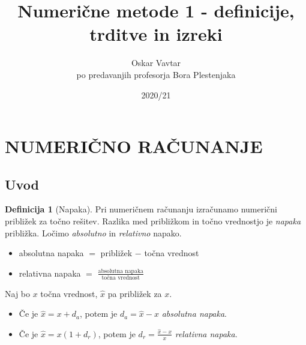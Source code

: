 \documentclass[11pt]{article}
\title{Numerične metode 1 - definicije, trditve in izreki}
\author{Oskar Vavtar \\
po predavanjih profesorja Bora Plestenjaka}
\date{2020/21}
\theoremstyle{definition}
\newtheorem{definicija}{Definicija}[section]
\begin{document}
\maketitle
\pagebreak
\tableofcontents
\pagebreak


\section{NUMERIČNO RAČUNANJE}
\vspace{0.5cm}


\subsection{Uvod}
\vspace{0.5cm}

\begin{definicija}[Napaka]

Pri numeričnem računanju izračunamo numerični približek za točno rešitev. Razlika med približkom in točno vrednostjo je \textit{napaka} približka. Ločimo \textit{absolutno} in \textit{relativno} napako.

\begin{itemize}
	\item absolutna napaka $=$ približek $-$ točna vrednost
	\item relativna napaka $=$ $\frac{\text{absolutna napaka}}{\text{točna vrednost}}$
\end{itemize}

Naj bo $x$ točna vrednost, $\hat{x}$ pa približek za $x$.

\begin{itemize}
	\item Če je $\hat{x} = x + d_a$, potem je $d_a = \hat{x} - x$ \textit{absolutna napaka}.
	\item Če je $\hat{x} = x(1 + d_r)$, potem je $d_r = \frac{\hat{x} - x}{x}$ \textit{relativna napaka}.
\end{itemize}

\end{definicija}
\vspace{0.5cm}

\end{document}
